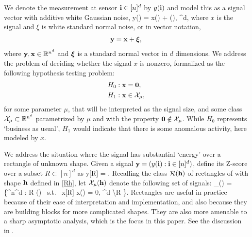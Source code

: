 \documentclass[twoside,11pt]{article}
\begin{document}
We denote the measurement at sensor $\mathbf{i} \in [n]^d$ by $y(\mathbf{i})$ and model this as a signal vector with additive white Gaussian noise,
\beq \label{model}
y(\ib) = x(\ib) + \xi(\ib), \quad \ib \in [n]^d,
\eeq
where $x$ is the signal and $\xi$ is white standard normal noise, or in vector notation,
\[
\mathbf{y} = \mathbf{x} + \bm{\xi},
\]
where $\mathbf{y}, \mathbf{x} \in \mathbb{R}^{n^d}$ and $\bm{\xi}$ is a standard normal vector in $d$ dimensions.
We address the problem of deciding whether the signal $x$ is nonzero, formalized as the following hypothesis testing problem:
\begin{equation}
\label{eq:test}
\begin{aligned}
  &H_0: \mathbf{x} = {\bf 0}, \\
  &H_1: \mathbf{x} \in \mathcal{X}_\mu,
\end{aligned}
\end{equation}
for some parameter $\mu$, that will be interpreted as the signal size, and some class $\mathcal{X}_\mu \subset \mathbb{R}^{n^d}$ parametrized by $\mu$ and with the property ${\bf 0} \notin \mathcal{X}_\mu$.
While $H_0$ represents `business as usual', $H_1$ would indicate that there is some anomalous activity, here modeled by $x$.

We address the situation where the signal has substantial `energy' over a rectangle of unknown shape.
Given a signal $\mathbf{y} = (y(\mathbf{i}) : \mathbf{i} \in [n]^d)$, define its Z-score over a subset $R \subset [n]^d$ as 
\beq \label{Z}
y[R] = .
\eeq
Recalling the class $\mathcal{R}(\mathbf{h})$ of rectangles of with shape $\mathbf{h}$ defined in \eqref{Rh}, let $\mathcal{X}_\mu(\mathbf{h})$ denote the following set of signals:
\beq \label{alt}
\Xcal_\mu(\hb) = \Big\{\xb \in \RR^{n^d} : \exists R \in \Rcal(\hb) {\rm~s.t.~} x[R] \ge {} x(\ib) = 0, \forall \ib \in [n]^d \backslash R \Big\}.
\eeq
%
Rectangles are useful in practice because of their ease of interpretation and implementation, and also because they are building blocks for more complicated shapes.  They are also more amenable to a sharp asymptotic analysis, which is the focus in this paper.
See the discussion in .
\end{document}
